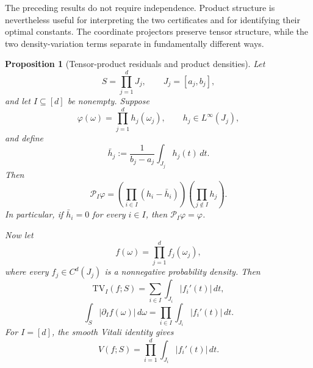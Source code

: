\documentclass[11pt,letterpaper]{article}
\newtheorem{proposition}[theorem]{Proposition}
\theoremstyle{definition}
\theoremstyle{remark}
\newcommand{\TV}{\mathrm{TV}}
\begin{document}
The preceding results do not require independence. Product structure is
nevertheless useful for interpreting the two certificates and for identifying
their optimal constants. The coordinate projectors preserve tensor structure,
while the two density-variation terms separate in fundamentally different
ways.

\begin{proposition}[Tensor-product residuals and product densities]
\label{prop:main_tensor_summary}
Let
$$
S=\prod_{j=1}^dJ_j,
\qquad
J_j=[a_j,b_j],
$$
and let $I\subseteq[d]$ be nonempty. Suppose
$$
\varphi(\omega)=\prod_{j=1}^dh_j(\omega_j),
\qquad
h_j\in L^\infty(J_j),
$$
and define
$$
\bar h_j
:=
\frac{1}{b_j-a_j}\int_{J_j}h_j(t)\,dt.
$$
Then
\begin{equation}
\label{eq:main_tensor_projector_formula}
\mathcal P_I\varphi
=
\left(\prod_{i\in I}(h_i-\bar h_i)\right)
\left(\prod_{j\notin I}h_j\right).
\end{equation}
In particular, if $\bar h_i=0$ for every $i\in I$, then
$\mathcal P_I\varphi=\varphi$.

Now let
$$
f(\omega)=\prod_{j=1}^df_j(\omega_j),
$$
where every $f_j\in C^d(J_j)$ is a nonnegative probability density. Then
\begin{equation}
\label{eq:main_product_TVI_formula}
\TV_I(f;S)
=
\sum_{i\in I}\int_{J_i}|f_i'(t)|\,dt,
\end{equation}
\begin{equation}
\label{eq:main_product_mixed_formula}
\int_S|\partial_If(\omega)|\,d\omega
=
\prod_{i\in I}\int_{J_i}|f_i'(t)|\,dt.
\end{equation}
For $I=[d]$, the smooth Vitali identity gives
\begin{equation}
\label{eq:main_product_vitali_formula}
V(f;S)
=
\prod_{i=1}^d\int_{J_i}|f_i'(t)|\,dt.
\end{equation}
\end{proposition}
\end{document}
